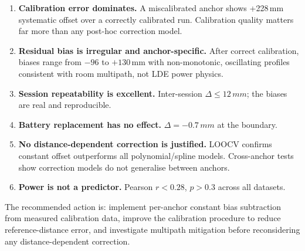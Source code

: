 \documentclass[10pt,a4paper,twocolumn]{article}
\begin{document}
\begin{enumerate}[noitemsep]

\item \textbf{Calibration error dominates.}  A miscalibrated anchor shows
  +228\,mm systematic offset over a correctly calibrated run.  Calibration
  quality matters far more than any post-hoc correction model.

\item \textbf{Residual bias is irregular and anchor-specific.}  After correct
  calibration, biases range from $-96$ to $+130$\,mm with non-monotonic,
  oscillating profiles consistent with room multipath, not LDE power physics.

\item \textbf{Session repeatability is excellent.}  Inter-session $\Delta
  \le 12\,mm$; the biases are real and reproducible.

\item \textbf{Battery replacement has no effect.}  $\Delta = -0.7\,mm$
  at the boundary.

\item \textbf{No distance-dependent correction is justified.}  LOOCV confirms
  constant offset outperforms all polynomial/spline models.  Cross-anchor tests
  show correction models do not generalise between anchors.

\item \textbf{Power is not a predictor.}  Pearson $r < 0.28$, $p > 0.3$
  across all datasets.

\end{enumerate}

The recommended action is: implement per-anchor constant bias subtraction
from measured calibration data, improve the calibration procedure to reduce
reference-distance error, and investigate multipath mitigation before
reconsidering any distance-dependent correction.
\end{document}
